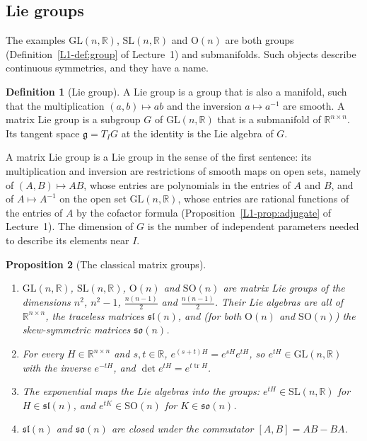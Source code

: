 \documentclass[11pt]{article}
\theoremstyle{definition}
\newtheorem{definition}{Definition}[section]
\theoremstyle{plain}
\newtheorem{proposition}[definition]{Proposition}
\theoremstyle{remark}
\DeclareMathOperator{\tr}{tr}
\begin{document}
\subsection{Lie groups}\label{sec:lie-groups}

The examples $\mathrm{GL}(n, \mathbb{R})$, $\mathrm{SL}(n, \mathbb{R})$ and $\mathrm{O}(n)$ are both groups (Definition~\ref{L1-def:group} of Lecture~1) and submanifolds. Such objects describe continuous symmetries, and they have a name.

\begin{definition}[Lie group]\label{def:lie-group}
    A Lie group is a group that is also a manifold, such that the multiplication $(a, b) \mapsto ab$ and the inversion $a \mapsto a^{-1}$ are smooth. A matrix Lie group is a subgroup $G$ of $\mathrm{GL}(n, \mathbb{R})$ that is a submanifold of $\mathbb{R}^{n \times n}$. Its tangent space $\mathfrak{g} = T_IG$ at the identity is the Lie algebra of $G$.
\end{definition}

A matrix Lie group is a Lie group in the sense of the first sentence: its multiplication and inversion are restrictions of smooth maps on open sets, namely of $(A, B) \mapsto AB$, whose entries are polynomials in the entries of $A$ and $B$, and of $A \mapsto A^{-1}$ on the open set $\mathrm{GL}(n, \mathbb{R})$, whose entries are rational functions of the entries of $A$ by the cofactor formula (Proposition~\ref{L1-prop:adjugate} of Lecture~1). The dimension of $G$ is the number of independent parameters needed to describe its elements near $I$.

\begin{proposition}[The classical matrix groups]\label{prop:lie-groups}
    \begin{enumerate}
        \item $\mathrm{GL}(n, \mathbb{R})$, $\mathrm{SL}(n, \mathbb{R})$, $\mathrm{O}(n)$ and $\mathrm{SO}(n)$ are matrix Lie groups of the dimensions $n^2$, $n^2 - 1$, $\frac{n(n-1)}{2}$ and $\frac{n(n-1)}{2}$. Their Lie algebras are all of $\mathbb{R}^{n \times n}$, the traceless matrices $\mathfrak{sl}(n)$, and (for both $\mathrm{O}(n)$ and $\mathrm{SO}(n)$) the skew-symmetric matrices $\mathfrak{so}(n)$.
        \item For every $H \in \mathbb{R}^{n \times n}$ and $s, t \in \mathbb{R}$, $e^{(s+t)H} = e^{sH}e^{tH}$, so $e^{tH} \in \mathrm{GL}(n, \mathbb{R})$ with the inverse $e^{-tH}$, and $\det e^{tH} = e^{t\tr H}$.
        \item The exponential maps the Lie algebras into the groups: $e^{tH} \in \mathrm{SL}(n, \mathbb{R})$ for $H \in \mathfrak{sl}(n)$, and $e^{tK} \in \mathrm{SO}(n)$ for $K \in \mathfrak{so}(n)$.
        \item $\mathfrak{sl}(n)$ and $\mathfrak{so}(n)$ are closed under the commutator $[A, B] = AB - BA$.
    \end{enumerate}
\end{proposition}
\end{document}
